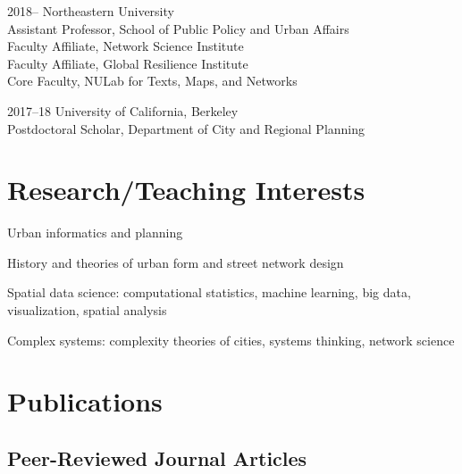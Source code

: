 \documentclass[12pt,letterpaper]{report}
\newcommand{\listitemspace}{0.15em}
\renewenvironment{itemize}
{\begin{list}{}{\setlength{\leftmargin}{0em}
				\setlength{\parskip}{0em}
				\setlength{\itemsep}{\listitemspace}
				\setlength{\parsep}{\listitemspace}}}
{\end{list}}
\begin{document}
\begin{tablist}                     

\item[2018--]   \tab Northeastern University \\
				Assistant Professor, School of Public Policy and Urban Affairs \\
		        Faculty Affiliate, Network Science Institute \\
		        Faculty Affiliate, Global Resilience Institute \\
		        Core Faculty, NULab for Texts, Maps, and Networks
			    

\item[2017--18] \tab University of California, Berkeley \\
				Postdoctoral Scholar, Department of City and Regional Planning
                

\end{tablist}



\section*{Research/Teaching Interests}

\begin{itemize}
	
\item Urban informatics and planning

\item History and theories of urban form and street network design

\item Spatial data science: computational statistics, machine learning, big data, visualization, spatial analysis

\item Complex systems: complexity theories of cities, systems thinking, network science

\end{itemize}



\section*{Publications}

\subsection*{Peer-Reviewed Journal Articles}
\end{document}
